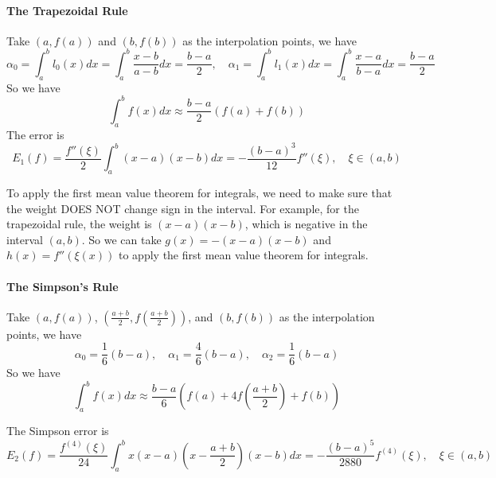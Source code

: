 \documentclass{matharticle}
\begin{document}
\paragraph{The Trapezoidal Rule}
Take $(a,f(a))$ and $(b,f(b))$ as the interpolation points, we have
\begin{equation*}
	\alpha_0 = \int_{a}^{b} l_0(x) dx = \int_{a}^{b} \frac{x - b}{a - b} dx = \frac{b - a}{2}, \quad \alpha_1 = \int_{a}^{b} l_1(x) dx = \int_{a}^{b} \frac{x - a}{b - a} dx = \frac{b - a}{2}
\end{equation*}
So we have
\begin{equation}
	\int_{a}^{b} f(x) dx \approx \frac{b - a}{2} (f(a) + f(b))
\end{equation}
The error is
\begin{equation}
	E_1(f) = \frac{f''(\xi)}{2} \int_{a}^{b} (x - a)(x - b) dx = -\frac{(b - a)^3}{12} f''(\xi), \quad \xi \in (a, b)
\end{equation}

\begin{remark}
	To apply the first mean value theorem for integrals, we need to make sure that the weight DOES NOT change sign in the interval. For example, for the trapezoidal rule, the weight is $(x - a)(x - b)$, which is negative in the interval $(a, b)$. So we can take $g(x) = -(x - a)(x - b)$ and $h(x) = f''(\xi(x))$ to apply the first mean value theorem for integrals.
\end{remark}

\paragraph{The Simpson's Rule}
Take $(a,f(a))$, $(\frac{a+b}{2}, f(\frac{a+b}{2}))$, and $(b,f(b))$ as the interpolation points, we have
\begin{equation}
	\alpha_0 = \frac{1}{6} (b - a), \quad \alpha_1 = \frac{4}{6} (b - a), \quad \alpha_2 = \frac{1}{6} (b - a)
\end{equation}
So we have
\begin{equation}
	\int_{a}^{b} f(x) dx \approx \frac{b - a}{6} (f(a) + 4 f(\frac{a+b}{2}) + f(b))
\end{equation}

The Simpson error is
\begin{equation}
	E_2(f) = \frac{f^{(4)}(\xi)}{24} \int_{a}^{b} x (x - a)(x - \frac{a+b}{2})(x - b) dx = -\frac{(b - a)^5}{2880} f^{(4)}(\xi), \quad \xi \in (a, b)
\end{equation}
\end{document}

